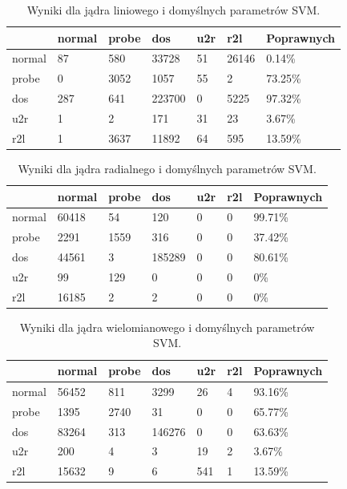 \documentclass[a4paper, 12pt]{article}
\begin{document}
\begin{table}[H]
\centering
\label{table:cm_svm_linear_default}
\begin{tabular}{ | l | l | l | l | l | l | l | } \hline
	& normal &  probe &   dos  &  u2r  & r2l 	& Poprawnych	\\ \hline
 normal  &   87 &  580 & 33728 & 51 & 26146 & 0.14\% \\ \hline
 probe   &    0 &  3052 &  1057 & 55  &   2 & 73.25\% \\ \hline
 dos     &  287 &  641  & 223700 &  0 & 5225 & 97.32\% \\ \hline
 u2r     &    1 &   2   &  171 & 31 &  23 & 3.67\% \\ \hline
 r2l     &   1  & 3637  &  11892 & 64 & 595 & 13.59\% \\ \hline
\end{tabular}
\caption{Wyniki dla jądra liniowego i domyślnych parametrów SVM.}
\end{table}

\begin{table}[H]
\centering
\label{table:cm_svm_radial_default}
\begin{tabular}{ | l | l | l | l | l | l | l | } \hline
	& normal &  probe &   dos  &  u2r  & r2l 	& Poprawnych	\\ \hline
  normal  & 60418  &  54   &  120   &  0 &  0 & 99.71\% \\ \hline
  probe   & 2291   &  1559 &   316  &  0 &  0 & 37.42\% \\ \hline
  dos     & 44561  &    3  & 185289 &  0 &  0 & 80.61\% \\ \hline
  u2r     &    99  & 129   &   0 &   0 &  0 & 0\% \\ \hline
  r2l     & 16185  &    2  &    2 &  0 &  0 & 0\% \\ \hline
\end{tabular} 
\caption{Wyniki dla jądra radialnego i domyślnych parametrów SVM.}
\end{table}

\begin{table}[H]
\centering
\label{table:cm_svm_poly_default}
\begin{tabular}{ | l | l | l | l | l | l | l | } \hline
	& normal &  probe &   dos  &  u2r  & r2l 	& Poprawnych	\\ \hline
  normal & 56452 &  811 &  3299 & 26 &  4 & 93.16\% \\ \hline
  probe  &  1395 & 2740 &    31 &  0 &  0 & 65.77\% \\ \hline
  dos    & 83264 &  313 & 146276 &  0 &  0 & 63.63\% \\ \hline
  u2r    &   200 &   4  &  3  & 19  & 2 & 3.67\% \\ \hline
  r2l    & 15632 &    9 &  6  & 541 &  1 & 13.59\% \\ \hline
\end{tabular} 
\caption{Wyniki dla jądra wielomianowego i domyślnych parametrów SVM.}
\end{table}
\end{document}
